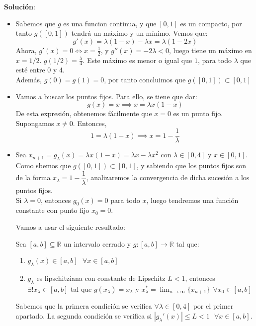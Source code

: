 \documentclass[11pt]{article}
\begin{document}
\textbf{Solución}:\\
\begin{itemize}
	\item Sabemos que $g$ es una funcion continua, y que $[0,1]$ es un compacto, por tanto $g([0,1])$ tendrá un máximo y un mínimo. Vemos que:
	\[
	g'(x) = \lambda(1-x) - \lambda x  = \lambda(1-2x)
	\]
	Ahora, $g'(x) = 0 \iff x = \frac{1}{2}$, y $g''(x) = -2 \lambda < 0$, luego tiene un máximo en $x=1/2$. $g(1/2) = \frac{\lambda}{4}$. Este máximo es menor o igual que $1$, para todo $\lambda$ que esté entre 0 y 4.\\
	Además, $g(0) = g(1) = 0$, por tanto concluimos que $g([0,1]) \subset [0,1]$
	
	\item Vamos a buscar los puntos fijos. Para ello, se tiene que dar:
	\[
	g(x) = x \implies x = \lambda x(1-x)
	\]
	De esta expresión, obtenemos fácilmente que $x=0$ es un punto fijo. Supongamos $x\ne0$. Entonces,
	\[
	1 = \lambda(1-x) \implies x = 1- \dfrac{1}{\lambda}
	\]
	
	
	\item Sea $x_{n+1} = g_\lambda(x) = \lambda x(1-x) = \lambda x - \lambda x^2$ con $\lambda \in [0,4]$ y $x \in [0,1]$. Como sbemos que $g([0,1]) \subset [0,1]$, y sabiendo que los puntos fijos son de la forma $x_\lambda = 1 - \dfrac{1}{\lambda}$, analizaremos la convergencia de dicha sucesión a los puntos fijos.\\
	Si $\lambda = 0$, entonces $g_0 (x) = 0$ para todo $x$, luego tendremos una función constante con punto fijo $x_0 = 0$.
	
	Vamos a usar el siguiente resultado:
	
	Sea $[a,b] \subseteq \mathbb R$ un intervalo cerrado y $g:[a,b] \to \mathbb R$ tal que:
	\begin{enumerate}
	\item $g_\lambda(x) \in [a,b] \ \ \ \forall x \in [a,b]$
	\item $g_\lambda$ es lipschitziana con constante de Lipschitz $L<1$, entonces $\exists ! x_\lambda \in [a,b]$ tal que $g(x_\lambda) = x_\lambda$ y $x_\lambda ^* = \lim_{n \to \infty} \{x_{n+1}\} \ \ \forall x_0 \in [a,b]$
\end{enumerate}

Sabemos que la primera condición se verifica $\forall \lambda \in [0,4]$ por el primer apartado. La segunda condición se verifica si $|g_\lambda'(x)| \leq L < 1 \ \ \ \forall x \in [a,b]$.


\end{itemize}
\end{document}
